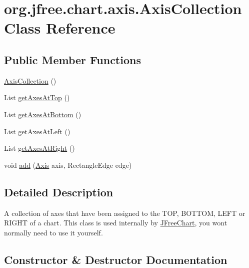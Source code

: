 \hypertarget{classorg_1_1jfree_1_1chart_1_1axis_1_1_axis_collection}{}\section{org.\+jfree.\+chart.\+axis.\+Axis\+Collection Class Reference}
\label{classorg_1_1jfree_1_1chart_1_1axis_1_1_axis_collection}
\subsection*{Public Member Functions}
\begin{DoxyCompactItemize}
\item 
\mbox{\hyperlink{classorg_1_1jfree_1_1chart_1_1axis_1_1_axis_collection_a6be5d7caf40bef32d919594007137a33}{Axis\+Collection}} ()
\item 
List \mbox{\hyperlink{classorg_1_1jfree_1_1chart_1_1axis_1_1_axis_collection_ac1857c2f5eb5f750d72f87756f81bea7}{get\+Axes\+At\+Top}} ()
\item 
List \mbox{\hyperlink{classorg_1_1jfree_1_1chart_1_1axis_1_1_axis_collection_a78370f10d2bf3201bf60b9e319ccfb8d}{get\+Axes\+At\+Bottom}} ()
\item 
List \mbox{\hyperlink{classorg_1_1jfree_1_1chart_1_1axis_1_1_axis_collection_a4c28425586df286844046931e1701a52}{get\+Axes\+At\+Left}} ()
\item 
List \mbox{\hyperlink{classorg_1_1jfree_1_1chart_1_1axis_1_1_axis_collection_a1ba84e35d8e980fdc84f6cd80b11d2d2}{get\+Axes\+At\+Right}} ()
\item 
void \mbox{\hyperlink{classorg_1_1jfree_1_1chart_1_1axis_1_1_axis_collection_add5e53fc802e7ef26056bf6274dbd5fd}{add}} (\mbox{\hyperlink{classorg_1_1jfree_1_1chart_1_1axis_1_1_axis}{Axis}} axis, Rectangle\+Edge edge)
\end{DoxyCompactItemize}


\subsection{Detailed Description}
A collection of axes that have been assigned to the T\+OP, B\+O\+T\+T\+OM, L\+E\+FT or R\+I\+G\+HT of a chart. This class is used internally by \mbox{\hyperlink{classorg_1_1jfree_1_1chart_1_1_j_free_chart}{J\+Free\+Chart}}, you won\textquotesingle{}t normally need to use it yourself. 

\subsection{Constructor \& Destructor Documentation}
\mbox{\label{classorg_1_1jfree_1_1chart_1_1axis_1_1_axis_collection_a6be5d7caf40bef32d919594007137a33}} 
